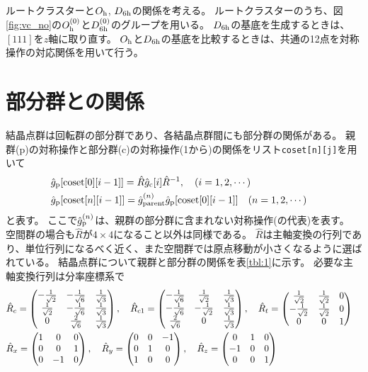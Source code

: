 \documentclass[11pt]{easymemo}
\begin{document}
ルートクラスターと$O_{\rm h}$, $D_{\rm 6h}$の関係を考える。
ルートクラスターのうち、図\ref{fig:vc_no}の$O_{\rm h}^{(0)}$と$D_{\rm 6h}^{(0)}$のグループを用いる。
$D_{\rm 6h}$の基底を生成するときは、$[111]$を$z$軸に取り直す。
$O_{\rm h}$と$D_{\rm 6h}$の基底を比較するときは、共通の12点を対称操作の対応関係を用いて行う。


\section{部分群との関係}

結晶点群は回転群の部分群であり、各結晶点群間にも部分群の関係がある。
親群(p)の対称操作と部分群(c)の対称操作(1から)の関係をリスト\texttt{coset[n][j]}を用いて
\begin{align}
&
\hat{g}_{\rm p}[{\rm coset}[0][i-1]]=\hat{R}\hat{g}_{\rm c}[i]\hat{R}^{-1},
\quad
(i=1,2,\cdots)
\cr&
\hat{g}_{\rm p}[{\rm coset}[n][i-1]]=\hat{g}_{\rm parent}^{(n)}\hat{g}_{\rm p}[{\rm coset}[0][i-1]]
\quad
(n=1,2,\cdots)
\end{align}
と表す。
ここで$\hat{g}_{\rm p}^{(n)}$は、親群の部分群に含まれない対称操作(の代表)を表す。
空間群の場合も$\hat{R}$が$4\times4$になること以外は同様である。
$\hat{R}$は主軸変換の行列であり、単位行列になるべく近く、また空間群では原点移動が小さくなるように選ばれている。
結晶点群について親群と部分群の関係を表\ref{tbl:1}に示す。
必要な主軸変換行列は分率座標系で
\begin{align}
&
\hat{R}_c = \begin{pmatrix}
-\frac{1}{\sqrt{2}} & -\frac{1}{\sqrt{6}} & \frac{1}{\sqrt{3}} \\
\frac{1}{\sqrt{2}} & -\frac{1}{\sqrt{6}} & \frac{1}{\sqrt{3}} \\
0 & \frac{2}{\sqrt{6}} & \frac{1}{\sqrt{3}}
\end{pmatrix},
\quad
\hat{R}_{c1} = \begin{pmatrix} -\frac{1}{\sqrt{6}} & \frac{1}{\sqrt{2}} & \frac{1}{\sqrt{3}} \\
-\frac{1}{\sqrt{6}} & -\frac{1}{\sqrt{2}} & \frac{1}{\sqrt{3}} \\
\frac{2}{\sqrt{6}} & 0 & \frac{1}{\sqrt{3}}
\end{pmatrix},
\quad
\hat{R}_t = \begin{pmatrix} \frac{1}{\sqrt{2}} & \frac{1}{\sqrt{2}} & 0 \\
-\frac{1}{\sqrt{2}} & \frac{1}{\sqrt{2}} & 0 \\
0 & 0 & 1
\end{pmatrix}
\cr&
\hat{R}_x = \begin{pmatrix} 1 & 0 & 0 \\ 0 & 0 & 1 \\ 0 & -1 & 0 \end{pmatrix},
\quad
\hat{R}_y = \begin{pmatrix} 0 & 0 & -1 \\ 0 & 1 & 0 \\ 1 & 0 & 0 \end{pmatrix},
\quad
\hat{R}_z = \begin{pmatrix} 0 & 1 & 0 \\ -1 & 0 & 0 \\ 0 & 0 & 1 \end{pmatrix}
\end{align}
\end{document}
